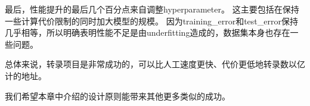 
最后，性能提升的最后几个百分点来自调整\gls{hyperparameter}。
这主要包括在保持一些计算代价限制的同时加大模型的规模。
因为\gls{training_error}和\gls{test_error}保持几乎相等，所以明确表明性能不足是由\gls{underfitting}造成的，数据集本身也存在一些问题。


总体来说，转录项目是非常成功的，可以比人工速度更快、代价更低地转录数以亿计的地址。

我们希望本章中介绍的设计原则能带来其他更多类似的成功。

